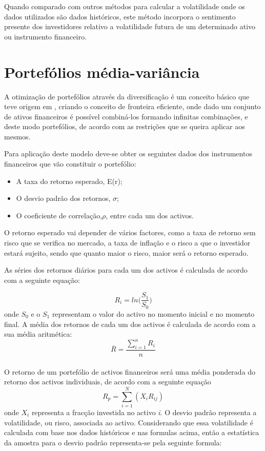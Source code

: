 \documentclass[
  12pt,
  a4paper,
  openany]{book}
\providecommand{\tightlist}{%
  \setlength{\itemsep}{0pt}\setlength{\parskip}{0pt}}
\theoremstyle{definition}
\theoremstyle{definition}
\theoremstyle{definition}
\theoremstyle{remark}
\begin{document}
Quando comparado com outros métodos para calcular a volatilidade onde os dados utilizados são dados históricos, este método incorpora o sentimento presente dos investidores relativo a volatilidade futura de um determinado ativo ou instrumento financeiro.

\hypertarget{portefuxf3lios-muxe9dia-variuxe2ncia}{%
\section{Portefólios média-variância}\label{portefuxf3lios-muxe9dia-variuxe2ncia}}

A otimização de portefólios através da diversificação é um conceito básico que teve origem em \citet{Markowitz1952}, criando o conceito de fronteira eficiente, onde dado um conjunto de ativos financeiros é possível combiná-los formando infinitas combinações, e deste modo portefólios, de acordo com as restrições que se queira aplicar aos mesmos.

Para aplicação deste modelo deve-se obter os seguintes dados dos instrumentos financeiros que vão constituir o portefólio:

\begin{itemize}
\tightlist
\item
  A taxa do retorno esperado, E(r);
\item
  O desvio padrão dos retornos, \(\sigma\);
\item
  O coeficiente de correlação,\(\rho\), entre cada um dos activos.
\end{itemize}

O retorno esperado vai depender de vários factores, como a taxa de retorno sem risco que se verifica no mercado, a taxa de inflação e o risco a que o investidor estará sujeito, sendo que quanto maior o risco, maior será o retorno esperado.

As séries dos retornos diários para cada um dos activos é calculada de acordo com a seguinte equação:

\begin{equation} 
  R_i = ln\Big(\frac{S_1}{S_0}\Big)
  \label{eq:logRet}
\end{equation}
onde \(S_0\) e o \(S_1\) representam o valor do activo no momento inicial e no momento final.
A média dos retornos de cada um dos activos é calculada de acordo com a sua média aritmética:
\begin{equation} 
  \overline{R} = \frac{\displaystyle\sum_{i=1}^n R_i}{n}
  \label{eq:meanRet}
\end{equation}\\
O retorno de um portefólio de activos financeiros será uma média ponderada do retorno dos activos individuais, de acordo com a seguinte equação
\begin{equation} 
    R_{p} = \sum_{i=1}^{N}(X_{i}R_{ij})
  \label{eq:retp}
\end{equation}
onde \(X_{i}\) representa a fracção investida no activo \emph{i}.
O desvio padrão representa a volatilidade, ou risco, associada ao activo. Considerando que essa volatilidade é calculada com base nos dados históricos e nas formulas acima, então a estatística da amostra para o desvio padrão representa-se pela seguinte formula:
\end{document}
